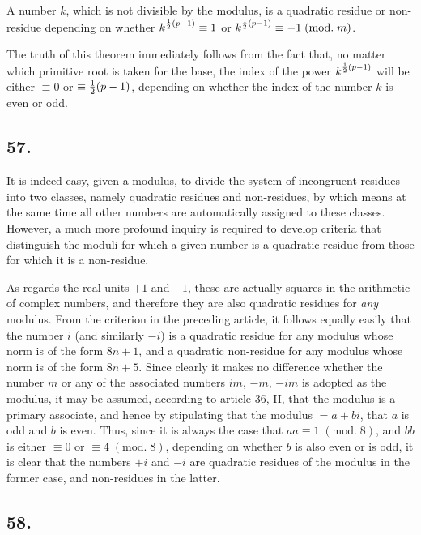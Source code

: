 \documentclass[twoside,12pt]{memoir}
\renewcommand{\pmod}[1]{\;(\textrm{mod.}\;#1)}
\let\oldfrac\frac
\def\frac#1#2{\mathchoice{\tfrac{#1}{#2}}{\oldfrac{#1}{#2}}{\genfrac{}{}{}{2}{#1}{#2\mathstrut}}{\genfrac{}{}{}{3}{#1}{#2\mathstrut}}}
\begin{document}
A number \(k\), which is not divisible by the modulus, is a quadratic residue or non-residue depending on whether \(k^{\frac{1}{2}(p-1)} \equiv 1\) or \(k^{\frac{1}{2}(p-1)} \equiv -1 \pmod{m}\).
 
The truth of this theorem immediately follows from the fact that, no matter which primitive root is taken for the base, the index of the power \(k^{\frac{1}{2}(p-1)}\) will be either \(\equiv 0\) or \(\equiv \frac{1}{2}(p-1) \), depending on whether the index of the number \(k\) is even or odd.

\subsection*{57.}

It is indeed easy, given a modulus, to divide the system of incongruent residues into two classes, namely quadratic residues and non-residues, by which means at the same time all other numbers are automatically assigned to these classes. However, a much more profound inquiry is required to develop criteria that distinguish the moduli for which a given number is a quadratic residue from those for which it is a non-residue.

As regards the real units \(+1\) and \(-1\), these are actually squares in the arithmetic of complex numbers, and therefore they are also quadratic residues for \textit{any} modulus.  From the criterion in the preceding article, it follows equally easily that the number \(i\) (and similarly \(-i\)) is a quadratic residue for any modulus whose norm is of the form \(8n+1\), and a quadratic non-residue for any modulus whose norm is of the form \(8n+5\). Since clearly it makes no difference whether the number \(m\) or any of the associated numbers \(im\), \(-m\), \(-im\) is adopted as the modulus, it may be assumed, according to article 36, II, that the modulus is a primary associate, and hence by stipulating that the modulus \(=a+bi\), that \(a\) is odd and \(b\) is even. Thus, since it is always the case that \(a a\equiv 1\pmod{8}\), and \(b b\) is either \(\equiv 0\) or \(\equiv 4\pmod{8}\), depending on whether \(b\) is also even or is odd, it is clear that the numbers \(+i\) and \(-i\) are quadratic residues of the modulus in the former case, and non-residues in the latter.\pagebreak%

\subsection*{58.}
 
\end{document}
